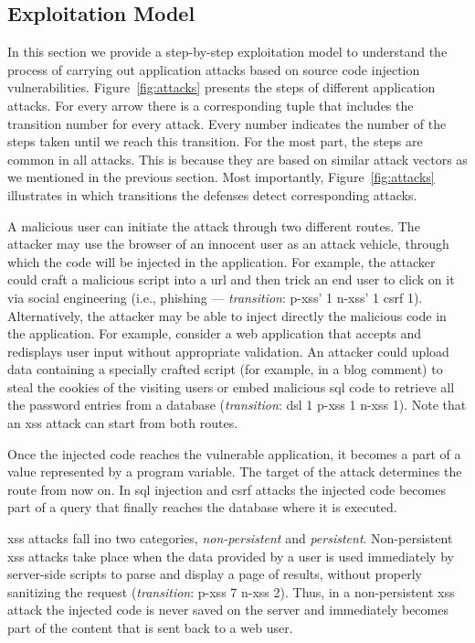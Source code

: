 \documentclass[conference]{IEEEtran}
\begin{document}

\subsection{Exploitation Model}
\label{sec:model}

In this section we provide a step-by-step exploitation model to
understand the process of carrying out application attacks based on
source code injection vulnerabilities.
Figure~\ref{fig:attacks} presents the steps of different application
attacks. For every arrow there is a
corresponding tuple that includes the transition number for
every attack. Every number indicates the number of the
steps taken until we reach this transition.
For the most part, the steps are common in all attacks. This
is because they are based on similar attack vectors as we mentioned in
the previous section. Most importantly,
Figure~\ref{fig:attacks} illustrates in which transitions
the defenses detect corresponding attacks.

A malicious user can initiate the attack through two different routes.
The attacker may use the browser of an innocent user as an attack
vehicle, through which the code will be injected in the application.
For example, the attacker could craft a malicious script into a {\sc url}
and then trick an end user to click on it via social engineering (i.e., phishing ---
{\it transition}: {\sc p-xss}' 1 \text{\textbar} {\sc n-xss}' 1 \text{\textbar} {\sc csrf} 1).
Alternatively, the attacker may be able to inject
directly the malicious code in the application. For example, consider
a web application that accepts and redisplays user input
without appropriate validation. An attacker could
upload data containing a specially crafted script (for example, in a
blog comment) to steal the cookies of the visiting users or embed
malicious {\sc sql} code to retrieve all the password entries from a
database ({\it transition}: {\sc dsl} 1 \text{\textbar}
{\sc p-xss} 1 \text{\textbar} {\sc n-xss} 1).
Note that an {\sc xss} attack can start from both routes.

Once the injected code reaches the vulnerable application, it becomes
a part of a value represented by a program variable. The target of the
attack determines the route from now on. In {\sc sql} injection and
{\sc csrf} attacks the injected code becomes part of a query that
finally reaches the database where it is executed. 

{\sc xss} attacks fall ino two categories, {\it non-persistent} and
{\it persistent}. Non-persistent {\sc xss} attacks take place when the
data provided by a user is used immediately by server-side scripts to
parse and display a page of results, without properly sanitizing the
request ({\it transition}: {\sc p-xss} 7 \text{\textbar} {\sc n-xss} 2).
Thus, in a non-persistent {\sc xss} attack the injected code
is never saved on the server and immediately becomes part of the
content that is sent back to a web user.
\end{document}
